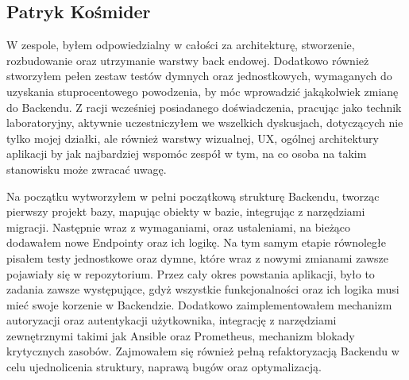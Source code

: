 \subsection{Patryk Kośmider}
\par W zespole, byłem odpowiedzialny w całości za architekturę, stworzenie, rozbudowanie oraz utrzymanie warstwy back endowej.
Dodatkowo również stworzyłem pełen zestaw testów dymnych oraz jednostkowych, wymaganych do uzyskania stuprocentowego powodzenia, by móc wprowadzić jakąkolwiek zmianę do \gls{Backend}u.
Z racji wcześniej posiadanego doświadczenia, pracując jako technik laboratoryjny, aktywnie uczestniczyłem we wszelkich dyskusjach, dotyczących nie tylko mojej działki, ale również warstwy wizualnej, \gls{UX}, ogólnej architektury aplikacji by jak najbardziej wspomóc zespół w tym, na co osoba na takim stanowisku może zwracać uwagę.
\par Na początku wytworzyłem w pełni początkową strukturę \gls{Backend}u, tworząc pierwszy projekt bazy, mapując obiekty w bazie, integrując z narzędziami migracji.
Następnie wraz z wymaganiami, oraz ustaleniami, na bieżąco dodawałem nowe \gls{Endpoint}y oraz ich logikę.
Na tym samym etapie równoległe pisałem testy jednostkowe oraz dymne, które wraz z nowymi zmianami zawsze pojawiały się w \gls{repozytorium}. Przez cały okres powstania aplikacji, było to zadania zawsze występujące, gdyż wszystkie funkcjonalności oraz ich logika musi mieć swoje korzenie w \gls{Backend}zie.
Dodatkowo zaimplementowałem mechanizm autoryzacji oraz autentykacji użytkownika, integrację z narzędziami zewnętrznymi takimi jak \gls{Ansible} oraz \gls{Prometheus}, mechanizm blokady krytycznych zasobów.
Zajmowałem się również pełną refaktoryzacją \gls{Backend}u w celu ujednolicenia struktury, naprawą bugów oraz optymalizacją.


